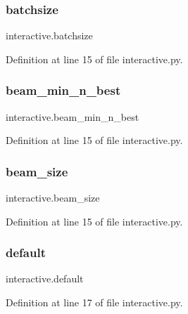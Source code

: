\subsubsection{\texorpdfstring{batchsize}{batchsize}}
{\footnotesize\ttfamily interactive.\+batchsize}



Definition at line 15 of file interactive.\+py.

\mbox{\label{namespaceinteractive_ac3dcd72d3c8650f4bd855aea64f42fdd}} 
\subsubsection{\texorpdfstring{beam\+\_\+min\+\_\+n\+\_\+best}{beam\_min\_n\_best}}
{\footnotesize\ttfamily interactive.\+beam\+\_\+min\+\_\+n\+\_\+best}



Definition at line 15 of file interactive.\+py.

\mbox{\label{namespaceinteractive_afd41c71f81720b70b28d9b4afe6bc7db}} 
\subsubsection{\texorpdfstring{beam\+\_\+size}{beam\_size}}
{\footnotesize\ttfamily interactive.\+beam\+\_\+size}



Definition at line 15 of file interactive.\+py.

\mbox{\label{namespaceinteractive_a2c33aa51409c0f1449a8e71af675f5d3}} 
\subsubsection{\texorpdfstring{default}{default}}
{\footnotesize\ttfamily interactive.\+default}



Definition at line 17 of file interactive.\+py.

